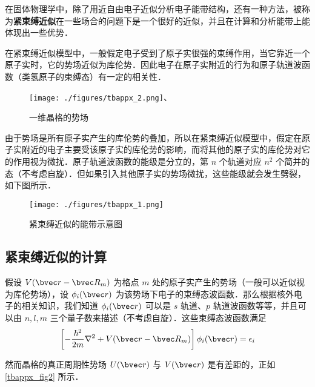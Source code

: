 

在固体物理学中，除了用近自由电子近似分析电子能带结构，还有一种方法，被称为\textbf{紧束缚近似}在一些场合的问题下是一个很好的近似，并且在计算和分析能带上能体现出一些优势．

在紧束缚近似模型中，一般假定电子受到了原子实很强的束缚作用，当它靠近一个原子实时，它的势场近似为库伦势．因此电子在原子实附近的行为和原子轨道波函数（类氢原子的束缚态）有一定的相关性．
\begin{figure}[ht]
\centering
\texttt{[image: ./figures/tbappx\_2.png]}、
\caption{一维晶格的势场} \label{tbappx_fig2}
\end{figure}


由于势场是所有原子实产生的库伦势的叠加，所以在紧束缚近似模型中，假定在原子实附近的电子主要受该原子实的库伦势的影响，而将其他的原子实的库伦势对它的作用视为微扰．原子轨道波函数的能级是分立的，第 $n$ 个轨道对应 $n^2$ 个简并的态（不考虑自旋）．但如果引入其他原子实的势场微扰，这些能级就会发生劈裂，如下图所示．

\begin{figure}[ht]
\centering
\texttt{[image: ./figures/tbappx\_1.png]}
\caption{紧束缚近似的能带示意图} \label{tbappx_fig1}
\end{figure}

\subsection{紧束缚近似的计算}

假设 $V(\bvec r-\bvec R_m)$ 为格点 $m$ 处的原子实产生的势场（一般可以近似视为库伦势场），设 $\phi_i(\bvec r)$ 为该势场下电子的束缚态波函数．那么根据核外电子的相关知识，我们知道 $\phi_i(\bvec r)$ 可以是 $s$ 轨道、$p$ 轨道波函数等等，并且可以由 $n,l,m$ 三个量子数来描述（不考虑自旋）．这些束缚态波函数满足
\begin{equation}
\left[-\frac{\hbar^2}{2m}\nabla^2+V(\bvec r-\bvec R_m)\right]\phi_i(\bvec r)=\epsilon_i
\end{equation}

然而晶格的真正周期性势场 $U(\bvec r)$ 与 $V(\bvec r)$ 是有差距的，正如 \autoref{tbappx_fig2} 所示．